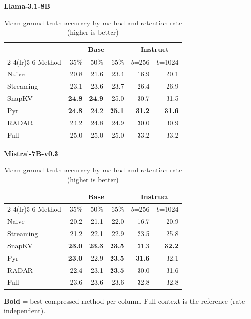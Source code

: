 \documentclass[10pt,letterpaper]{article}
\begin{document}
\begin{table}[H]
\centering
\small
\captionsetup{justification=centering}
\caption{Mean ground-truth accuracy by method and retention rate (higher is better)}
\label{tab:gt-allrates}
\begin{minipage}[t]{0.49\textwidth}
\centering
\textbf{Llama-3.1-8B}\\[0.4em]
\begin{tabular}{@{}lrrrrr@{}}
\toprule
& \multicolumn{3}{c}{Base} & \multicolumn{2}{c}{Instruct}\\
\cmidrule(lr){2-4}\cmidrule(lr){5-6}
Method & 35\% & 50\% & 65\% & $b$=256 & $b$=1024\\
\midrule
Naive      & 20.8 & 21.6 & 23.4 & 16.9 & 20.1\\
Streaming  & 23.1 & 23.6 & 23.7 & 26.4 & 26.9\\
SnapKV     & \textbf{24.8} & \textbf{24.9} & 25.0 & 30.7 & 31.5\\
Pyr        & \textbf{24.8} & 24.2 & \textbf{25.1} & \textbf{31.2} & \textbf{31.6}\\
RADAR      & 24.2 & 24.8 & 24.9 & 30.0 & 30.9\\
\midrule
Full       & 25.0 & 25.0 & 25.0 & 33.2 & 33.2\\
\bottomrule
\end{tabular}
\end{minipage}%
\hfill
\begin{minipage}[t]{0.49\textwidth}
\centering
\textbf{Mistral-7B-v0.3}\\[0.4em]
\begin{tabular}{@{}lrrrrr@{}}
\toprule
& \multicolumn{3}{c}{Base} & \multicolumn{2}{c}{Instruct}\\
\cmidrule(lr){2-4}\cmidrule(lr){5-6}
Method & 35\% & 50\% & 65\% & $b$=256 & $b$=1024\\
\midrule
Naive      & 20.2 & 21.1 & 22.0 & 16.7 & 20.9\\
Streaming  & 21.2 & 22.1 & 22.9 & 23.5 & 25.8\\
SnapKV     & \textbf{23.0} & \textbf{23.3} & \textbf{23.5} & 31.3 & \textbf{32.2}\\
Pyr        & \textbf{23.0} & 22.9 & \textbf{23.5} & \textbf{31.6} & 32.1\\
RADAR      & 22.4 & 23.1 & \textbf{23.5} & 30.0 & 31.6\\
\midrule
Full       & 23.6 & 23.6 & 23.6 & 32.8 & 32.8\\
\bottomrule
\end{tabular}
\end{minipage}
\par\smallskip
\textbf{Bold} = best compressed method per column. Full context is the reference (rate-independent).
\end{table}
\end{document}
